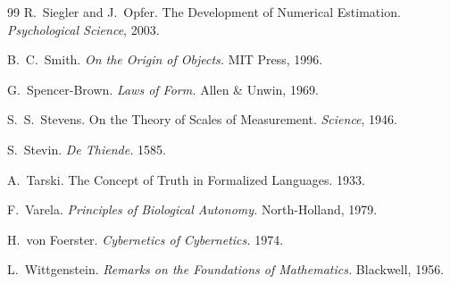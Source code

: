 \documentclass[12pt,a4paper]{article}
\theoremstyle{definition}
\theoremstyle{remark}
\begin{document}
\begin{thebibliography}{99}
R.~Siegler and J.~Opfer.
The Development of Numerical Estimation.
\emph{Psychological Science}, 2003.

B.~C.~Smith.
\emph{On the Origin of Objects.}
MIT Press, 1996.

G.~Spencer-Brown.
\emph{Laws of Form.}
Allen \& Unwin, 1969.

S.~S.~Stevens.
On the Theory of Scales of Measurement.
\emph{Science}, 1946.

S.~Stevin.
\emph{De Thiende.} 1585.

A.~Tarski.
The Concept of Truth in Formalized Languages. 1933.

F.~Varela.
\emph{Principles of Biological Autonomy.}
North-Holland, 1979.

H.~von Foerster.
\emph{Cybernetics of Cybernetics.} 1974.

L.~Wittgenstein.
\emph{Remarks on the Foundations of Mathematics.}
Blackwell, 1956.

\end{thebibliography}
\end{document}
